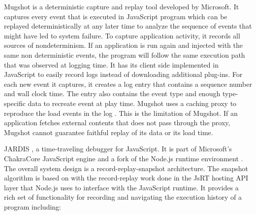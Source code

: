 \documentclass[12pt,journal]{IEEEtran}
\begin{document}
\par
Mugshot \cite{Mickens:2010:MDC:1855711.1855722} is a deterministic capture and replay tool developed by Microsoft. It captures every event that is executed in JavaScript program which can be replayed deterministically at any later time to analyze the sequence of events that might have led to system failure. To capture application activity, it records all sources of nondeterminism. If an application is run again and injected with the same non deterministic events, the program will follow the same execution path that was observed at logging time. It has its client side implemented in JavaScript to easily record logs instead of downloading additional plug-ins. For each new event it captures, it creates a log entry that contains a sequence number and wall clock time. The entry also contains the event type and enough type-specific data to recreate event at play time. Mugshot uses a caching proxy to reproduce the load events in the log . This is the limitation of Mugshot. If an application fetches external contents that does not pass through the proxy, Mugshot cannot guarantee faithful replay of its data or its load time.

\par
JARDIS \cite{time-travel-debugging-javascriptnode-js}, a time-traveling debugger for JavaScript. It is part of Microsoft’s ChakraCore JavaScript engine and a fork of the Node.js runtime environment . The overall system design is a record-replay-snapshot architecture. The snapshot algorithm is based on \cite{Barr:2014:TAT:2714064.2660209} with the record-replay work done in the JsRT hosting API layer  that Node.js uses to interface with the JavaScript runtime. 
It provides a rich set of functionality for recording and navigating the execution history of a program including: \\
\end{document}
